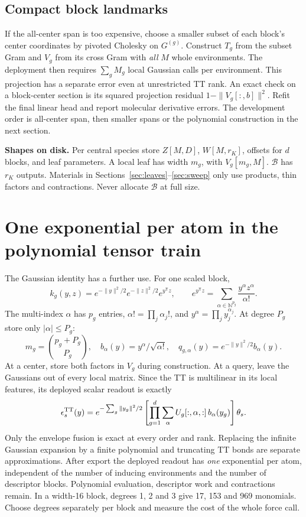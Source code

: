 \documentclass[11pt,a4paper]{article}
\newcommand{\T}{\mathsf T}\newcommand{\tr}{\operatorname{tr}}
\begin{document}
\subsection{Compact block landmarks}
If the all-center span is too expensive, choose a smaller subset of each block's center coordinates by pivoted Cholesky on $G^{(g)}$. Construct $T_g$ from the subset Gram and $V_g$ from its cross Gram with \emph{all} $M$ whole environments. The deployment then requires $\sum_g M_g$ local Gaussian calls per environment. This projection has a separate error even at unrestricted TT rank. An exact check on a block-center section is its squared projection residual $1-\|V_g[:,b]\|^2$. Refit the final linear head and report molecular derivative errors. The development order is all-center span, then smaller spans or the polynomial construction in the next section.

\textbf{Shapes on disk.} Per central species store $Z[M,D]$, $W[M,r_K]$, offsets for $d$ blocks, and leaf parameters. A local leaf has width $m_g$, with $V_g[m_g,M]$. $\mathcal B$ has $r_K$ outputs. Materials in Sections~\ref{sec:leaves}--\ref{sec:sweep} only use products, thin factors and contractions. Never allocate $\mathcal B$ at full size.

\pg\section{One exponential per atom in the polynomial tensor train}\label{sec:taylor}
The Gaussian identity has a further use. For one scaled block,
\[
 k_g(y,z)=e^{-\|y\|^2/2}e^{-\|z\|^2/2}e^{y^\T z},\qquad
 e^{y^\T z}=\sum_{\alpha\in\mathbb N^{p_g}}\frac{y^\alpha z^\alpha}{\alpha!}.
\]
The multi-index $\alpha$ has $p_g$ entries, $\alpha!=\prod_j\alpha_j!$, and $y^\alpha=\prod_j y_j^{\alpha_j}$. At degree $P_g$ store only $|\alpha|\le P_g$:
\begin{equation}
 m_g=\binom{p_g+P_g}{P_g},\quad
 b_\alpha(y)=y^\alpha/\sqrt{\alpha!},\quad
 q_{g,\alpha}(y)=e^{-\|y\|^2/2}b_\alpha(y). \label{eq:taylor}
\end{equation}
At a center, store both factors in $V_g$ during construction. At a query, leave the Gaussians out of every local matrix. Since the TT is multilinear in its local features, its deployed scalar readout is exactly
\begin{equation}
 \epsilon_s^{\rm TT}(y)=
 e^{-\sum_g\|y_g\|^2/2}
 \left[\prod_{g=1}^d\sum_{\alpha} U_g[:,\alpha,:]\,b_\alpha(y_g)\right]\theta_s .
 \label{eq:singleenv}
\end{equation}
Only the envelope fusion is exact at every order and rank. Replacing the infinite Gaussian expansion by a finite polynomial and truncating TT bonds are separate approximations. After export the deployed readout has \emph{one} exponential per atom, independent of the number of inducing environments and the number of descriptor blocks. Polynomial evaluation, descriptor work and contractions remain. In a width-16 block, degrees 1, 2 and 3 give 17, 153 and 969 monomials. Choose degrees separately per block and measure the cost of the whole force call.
\end{document}
